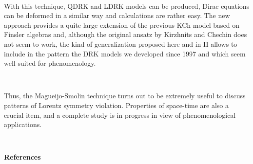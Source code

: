 \documentclass[a4paper,12pt,dvips]{article}
\begin{document}
~ 

With this technique, QDRK and LDRK models can be produced, Dirac equations can be deformed in a similar way and calculations are rather easy. The new approach provides a quite large extension of the previous KCh model based on Finsler algebras and, although the original ansatz by Kirzhnits and Chechin does not seem to work, the kind of generalization proposed here and in II allows to include in the pattern the DRK models we developed since 1997 and which seem well-suited for phenomenology.

~ 

Thus, the Magueijo-Smolin technique turns out to be extremely useful to discuss patterns of Lorentz symmetry violation. Properties of space-time are also a crucial item, and a complete study is in progress in view of phenomenological applications.

~ 
~ 

%
%
%
\vspace{1ex}
\begin{center}
{\bf References}
\end{center}
\end{document}
